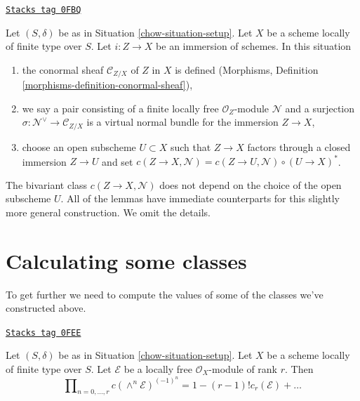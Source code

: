\begin{remark}

\label{chow-remark-gysin-for-immersion}
\href{https://stacks.math.columbia.edu/tag/0FBQ}{\texttt{Stacks tag 0FBQ}}

Let $(S, \delta)$ be as in Situation \ref{chow-situation-setup}.
Let $X$ be a scheme locally of finite type over $S$.
Let $i : Z \to X$ be an immersion of schemes.
In this situation
\begin{enumerate}
\item the conormal sheaf $\mathcal{C}_{Z/X}$
of $Z$ in $X$ is defined
(Morphisms, Definition \ref{morphisms-definition-conormal-sheaf}),
\item we say a pair consisting of a finite locally free $\mathcal{O}_Z$-module
$\mathcal{N}$ and a surjection $\sigma : \mathcal{N}^\vee \to \mathcal{C}_{Z/X}$
is a virtual normal bundle for the immersion $Z \to X$,
\item choose an open subscheme $U \subset X$ such that $Z \to X$
factors through a closed immersion $Z \to U$ and set
$c(Z \to X, \mathcal{N}) = c(Z \to U, \mathcal{N}) \circ (U \to X)^*$.
\end{enumerate}
The bivariant class $c(Z \to X, \mathcal{N})$ does not depend on the choice
of the open subscheme $U$. All of the lemmas have immediate counterparts
for this slightly more general construction. We omit the details.
\end{remark}

\section{Calculating some classes}
\label{chow-section-calculate}
To get further we need to compute the values of some of the
classes we've constructed above.

\begin{lemma}
\label{chow-lemma-compute-koszul}
\href{https://stacks.math.columbia.edu/tag/0FEE}{\texttt{Stacks tag 0FEE}}

Let $(S, \delta)$ be as in Situation \ref{chow-situation-setup}. Let $X$
be a scheme locally of finite type over $S$. Let $\mathcal{E}$
be a locally free $\mathcal{O}_X$-module of rank $r$.
Then
$$
\prod\nolimits_{n = 0, \ldots, r} c(\wedge^n \mathcal{E})^{(-1)^n} =
1 - (r - 1)! c_r(\mathcal{E}) + \ldots
$$
\end{lemma}


